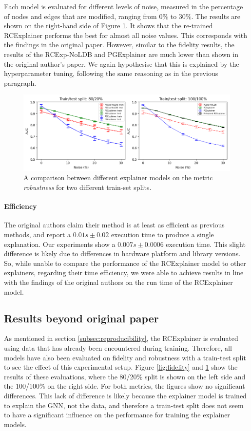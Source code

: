 Each model is evaluated for different levels of noise, measured in the percentage of nodes and edges that are modified, ranging from 0\% to 30\%. The results are shown on the right-hand side of Figure \ref{fig:noise}. It shows that the re-trained RCExplainer performs the best for almost all noise values. This corresponds with the findings in the original paper. However, similar to the fidelity results, the results of the RCExp-NoLDB and PGExplainer are much lower than shown in the original author’s paper. We again hypothesise that this is explained by the hyperparameter tuning, following the same reasoning as in the previous paragraph.

\begin{figure}[h]
    \centerline{\includegraphics[width=1\textwidth]{Images/noise_10_2.png}}
    \caption{A comparison between different explainer models on the metric \textit{robustness} for two different train-set splits.}
    \label{fig:noise}
\end{figure}
\paragraph{Efficiency}
The original authors claim their method is at least as efficient as previous methods, and report a $0.01s\pm 0.02$ execution time to produce a single explanation. Our experiments show a $0.007s\pm 0.0006$ execution time. This slight difference is likely due to differences in hardware platform and library versions. So, while unable to compare the performance of the RCExplainer model to other explainers, regarding their time efficiency, we were able to achieve results in line with the findings of the original authors on the run time of the RCExplainer model.


\subsection{Results beyond original paper} \label{subsec:res_beyond_paper}
As mentioned in section \ref{subsec:reproducibility}, the RCExplainer is evaluated using data that has already been encountered during training. Therefore, all models have also been evaluated on fidelity and robustness with a train-test split to see the effect of this experimental setup. Figure \ref{fig:fidelity} and \ref{fig:noise} show the results of these evaluations, where the 80/20\% split is shown on the left side and the 100/100\% on the right side. For both metrics, the figures show no significant differences. This lack of difference is likely because the explainer model is trained to explain the GNN, not the data, and therefore a train-test split does not seem to have a significant influence on the performance for training the explainer models.

